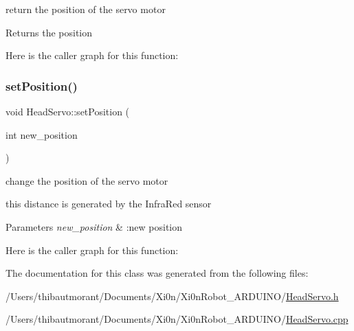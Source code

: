 return the position of the servo motor 

\begin{DoxyReturn}{Returns}
the position 
\end{DoxyReturn}
Here is the caller graph for this function\+:
\mbox{\label{class_head_servo_a43ae8a0a9b586c55cd4e59a779eea4a9}} 
\subsubsection{\texorpdfstring{set\+Position()}{setPosition()}}
{\footnotesize\ttfamily void Head\+Servo\+::set\+Position (\begin{DoxyParamCaption}\item[{int}]{new\+\_\+position }\end{DoxyParamCaption})}



change the position of the servo motor 

this distance is generated by the Infra\+Red sensor


\begin{DoxyParams}{Parameters}
{\em new\+\_\+position} & \+:new position \\
\hline
\end{DoxyParams}
Here is the caller graph for this function\+:


The documentation for this class was generated from the following files\+:\begin{DoxyCompactItemize}
\item 
/\+Users/thibautmorant/\+Documents/\+Xi0n/\+Xi0n\+Robot\+\_\+\+A\+R\+D\+U\+I\+N\+O/\hyperlink{_head_servo_8h}{Head\+Servo.\+h}\item 
/\+Users/thibautmorant/\+Documents/\+Xi0n/\+Xi0n\+Robot\+\_\+\+A\+R\+D\+U\+I\+N\+O/\hyperlink{_head_servo_8cpp}{Head\+Servo.\+cpp}\end{DoxyCompactItemize}
